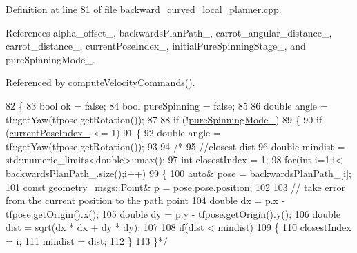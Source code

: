 Definition at line 81 of file backward\+\_\+curved\+\_\+local\+\_\+planner.\+cpp.



References alpha\+\_\+offset\+\_\+, backwards\+Plan\+Path\+\_\+, carrot\+\_\+angular\+\_\+distance\+\_\+, carrot\+\_\+distance\+\_\+, current\+Pose\+Index\+\_\+, initial\+Pure\+Spinning\+Stage\+\_\+, and pure\+Spinning\+Mode\+\_\+.



Referenced by compute\+Velocity\+Commands().


\begin{DoxyCode}
82 \{
83     \textcolor{keywordtype}{bool} ok = \textcolor{keyword}{false};
84     \textcolor{keywordtype}{bool} pureSpinning = \textcolor{keyword}{false};
85 
86     \textcolor{keywordtype}{double} angle = tf::getYaw(tfpose.getRotation());
87 
88     \textcolor{keywordflow}{if} (!\hyperlink{classmove__base__z__client_1_1backward__local__planner_1_1BackwardLocalPlanner_abf2b84c0d7a841a7fcec1b93bf5fdd0e}{pureSpinningMode\_})
89     \{
90         \textcolor{keywordflow}{if} (\hyperlink{classmove__base__z__client_1_1backward__local__planner_1_1BackwardLocalPlanner_af304b2e7cde744ad905a1ae7889102b6}{currentPoseIndex\_} <= 1)
91         \{
92             \textcolor{keywordtype}{double} angle = tf::getYaw(tfpose.getRotation());
93 
94             \textcolor{comment}{/*}
95 \textcolor{comment}{            //closest dist}
96 \textcolor{comment}{            double mindist = std::numeric\_limits<double>::max();}
97 \textcolor{comment}{            int closestIndex = 1;}
98 \textcolor{comment}{            for(int i=1;i< backwardsPlanPath\_.size();i++)}
99 \textcolor{comment}{            \{}
100 \textcolor{comment}{                auto& pose = backwardsPlanPath\_[i];}
101 \textcolor{comment}{                const geometry\_msgs::Point& p = pose.pose.position;}
102 \textcolor{comment}{}
103 \textcolor{comment}{                // take error from the current position to the path point}
104 \textcolor{comment}{                double dx = p.x - tfpose.getOrigin().x();}
105 \textcolor{comment}{                double dy = p.y - tfpose.getOrigin().y();}
106 \textcolor{comment}{                double dist = sqrt(dx * dx + dy * dy);}
107 \textcolor{comment}{}
108 \textcolor{comment}{                if(dist < mindist)}
109 \textcolor{comment}{                \{}
110 \textcolor{comment}{                    closestIndex = i;}
111 \textcolor{comment}{                    mindist = dist;}
112 \textcolor{comment}{                \}}
113 \textcolor{comment}{            \}*/}

\end{DoxyCode}
